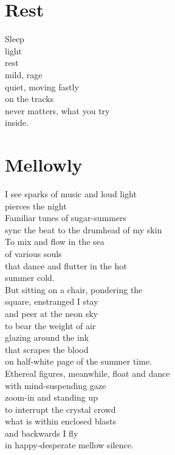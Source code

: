 \documentclass[a4paper,twoside, openany]{book}
\newenvironment{Verse}
  {\center\varwidth{\linewidth}\fontsize{18}{21.6}\selectfont}
  {\endvarwidth\endcenter}
\begin{document}
\chapter{Rest}
\begin{Verse}
Sleep\\
light\\
rest\\
mild, rage\\
quiet, moving fastly\\
on the tracks\\
never matters, what you try\\
inside.
\end{Verse}
\chapter{Mellowly}
\begin{Verse}
I see sparks of music and loud light\\
pierces the night\\
Familiar tunes of sugar-summers\\
sync the beat to the drumhead of my skin\\
To mix and flow in the sea\\
of various souls\\
that dance and flutter in the hot\\
summer cold.\\
But sitting on a chair, pondering the\\
square, enstranged I stay\\
and peer at the neon sky\\
to bear the weight of air\\
glazing around the ink\\
that scrapes the blood\\
on half-white page of the summer time.\\
Ethereal figures, meanwhile, float and dance\\
with mind-suspending gaze\\
zoom-in and standing up\\
to interrupt the crystal crowd\\
what is within enclosed blasts\\
and backwards I fly\\
in happy-desperate mellow silence.
\end{Verse}
\end{document}
